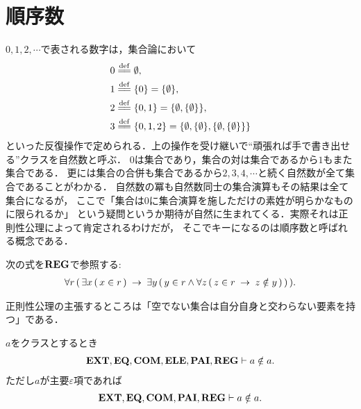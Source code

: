 \section{順序数}
	$0,1,2,\cdots$で表される数字は，集合論において
	\begin{align}
		0 &\defeq \emptyset, \\
		1 &\defeq \{0\} = \{\emptyset\}, \\
		2 &\defeq \{0,1\} = \{\emptyset,\{\emptyset\}\}, \\
		3 &\defeq \{0,1,2\} = \{\emptyset,\{\emptyset\},\{\emptyset,\{\emptyset\}\}\}
	\end{align}
	といった反復操作で定められる．上の操作を受け継いで``頑張れば手で書き出せる''クラスを自然数と呼ぶ．
	$0$は集合であり，集合の対は集合であるから$1$もまた集合である．
	更には集合の合併も集合であるから$2,3,4,\cdots$と続く自然数が全て集合であることがわかる．
	自然数の冪も自然数同士の集合演算もその結果は全て集合になるが，
	ここで「集合は$0$に集合演算を施しただけの素姓が明らかなものに限られるか」
	という疑問というか期待が自然に生まれてくる．実際それは正則性公理によって肯定されるわけだが，
	そこでキーになるのは順序数と呼ばれる概念である．
	
	\begin{screen}
		\begin{axm}[正則性公理]
			次の式を$\mbox{{\bf REG}}$で参照する:
			\begin{align}
				\forall r\, (\, \exists x\, (\, x \in r\, )
				\hspace{0.25em}\rightarrow\hspace{0.25em} \exists y\, (\, y \in r \wedge \forall z\, 
				(\, z \in r \hspace{0.25em}\rightarrow\hspace{0.25em} z \notin y\, )\, )\, ).
			\end{align}
		\end{axm}
	\end{screen}
	
	正則性公理の主張するところは「空でない集合は自分自身と交わらない要素を持つ」である．
	
	\begin{screen}
		\begin{thm}[クラスは自分自身を要素に持たない]
		\label{thm:no_class_contains_itself}
			$a$をクラスとするとき
			\begin{align}
				\mbox{{\bf EXT}},\mbox{{\bf EQ}},\mbox{\bf COM},\mbox{{\bf ELE}},\mbox{{\bf PAI}},\mbox{{\bf REG}} \vdash a \notin a.
			\end{align}
			ただし$a$が主要$\varepsilon$項であれば
			\begin{align}
				\mbox{{\bf EXT}},\mbox{{\bf EQ}},\mbox{\bf COM},\mbox{{\bf PAI}},\mbox{{\bf REG}} \vdash a \notin a.
			\end{align}
		\end{thm}
	\end{screen}
	
